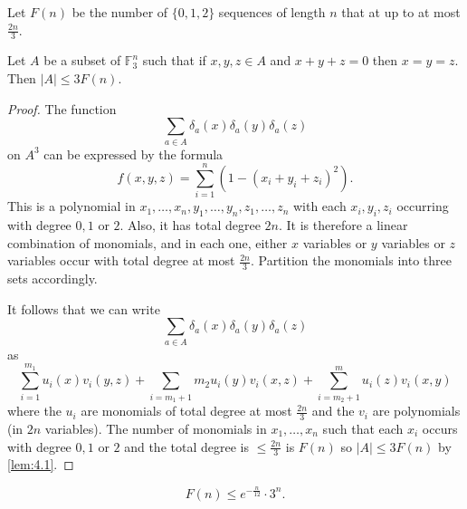 \documentclass{article}
\newcommand{\1}[1]{\mathbbm{1}_{#1}}
\begin{document}
Let $F(n)$ be the number of $\{0,1,2\}$ sequences of length $n$ that at up to at most $\frac{2n}{3}$.
\begin{nlemma}
  Let $A$ be a subset of $\mathbb{F}_3^n$ such that if $x,y,z \in A$ and $x+y+z=0$ then $x=y=z$.
  Then $|A| \leq 3 F(n)$.
\end{nlemma}
\begin{proof}
  The function
  \begin{equation*}
    \sum_{a \in A} \delta_a(x) \delta_a(y) \delta_a(z)
  \end{equation*}
  on $A^3$ can be expressed by the formula
  \begin{equation*}
    f(x,y,z) = \sum_{i=1}^n (1-(x_i+y_i+z_i)^2).
  \end{equation*}
  This is a polynomial in $x_1, \dotsc, x_n, y_1, \dotsc, y_n, z_1, \dotsc, z_n$ with each $x_i,y_i,z_i$ occurring with degree $0,1$ or $2$.
  Also, it has total degree $2n$. It is therefore a linear combination of monomials, and in each one, either $x$ variables or $y$ variables or $z$ variables occur with total degree at most $\frac{2n}{3}$.
  Partition the monomials into three sets accordingly.

  It follows that we can write
  \begin{equation*}
    \sum_{a \in A} \delta_a(x) \delta_a(y) \delta_a(z)
  \end{equation*}
  as
  \begin{equation*}
    \sum_{i=1}^{m_1} u_i(x) v_i(y,z) + \sum_{i=m_1+1}{m_2} u_i(y) v_i(x,z) + \sum_{i=m_2+1}^m u_i(z) v_i(x,y)
  \end{equation*}
  where the $u_i$ are monomials of total degree at most $\frac{2n}{3}$ and the $v_i$ are polynomials (in $2n$ variables).
  The number of monomials in $x_1, \dotsc, x_n$ such that each $x_i$ occurs with degree $0,1$ or $2$ and the total degree is $\leq \frac{2n}{3}$ is $F(n)$ so $|A| \leq 3 F(n)$ by \cref{lem:4.1}.
\end{proof}
\begin{nlemma}\label{lem:4.3}
  \begin{equation*}
    F(n) \leq e^{-\frac{n}{12}} \cdot 3^n.
  \end{equation*}
\end{nlemma}
\end{document}
